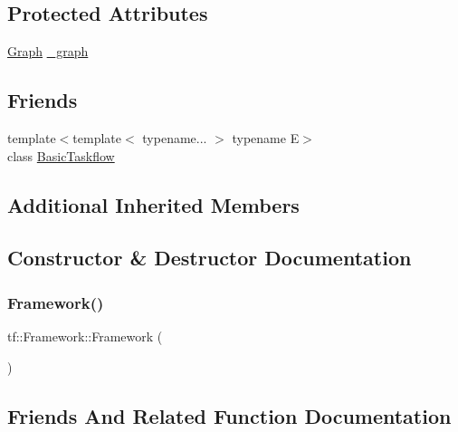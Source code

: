 \subsection*{Protected Attributes}
\begin{DoxyCompactItemize}
\item 
\hyperlink{namespacetf_a2afa7da139285640eaf8122535136dc9}{Graph} \hyperlink{classtf_1_1Framework_a935110e9ab91f5a520f9354409892d20}{\+\_\+graph}
\end{DoxyCompactItemize}
\subsection*{Friends}
\begin{DoxyCompactItemize}
\item 
{\footnotesize template$<$template$<$ typename... $>$ typename E$>$ }\\class \hyperlink{classtf_1_1Framework_ab3ad8c5c7ed22c3fbd8a41b84db75083}{Basic\+Taskflow}
\end{DoxyCompactItemize}
\subsection*{Additional Inherited Members}


\subsection{Constructor \& Destructor Documentation}
\mbox{\label{classtf_1_1Framework_a4a9bb59001066e07cbcc9c8f2debb75c}} 
\subsubsection{\texorpdfstring{Framework()}{Framework()}}
{\footnotesize\ttfamily tf\+::\+Framework\+::\+Framework (\begin{DoxyParamCaption}{ }\end{DoxyParamCaption})\hspace{0.3cm}{\ttfamily [inline]}}



\subsection{Friends And Related Function Documentation}
\mbox{\label{classtf_1_1Framework_ab3ad8c5c7ed22c3fbd8a41b84db75083}} 
